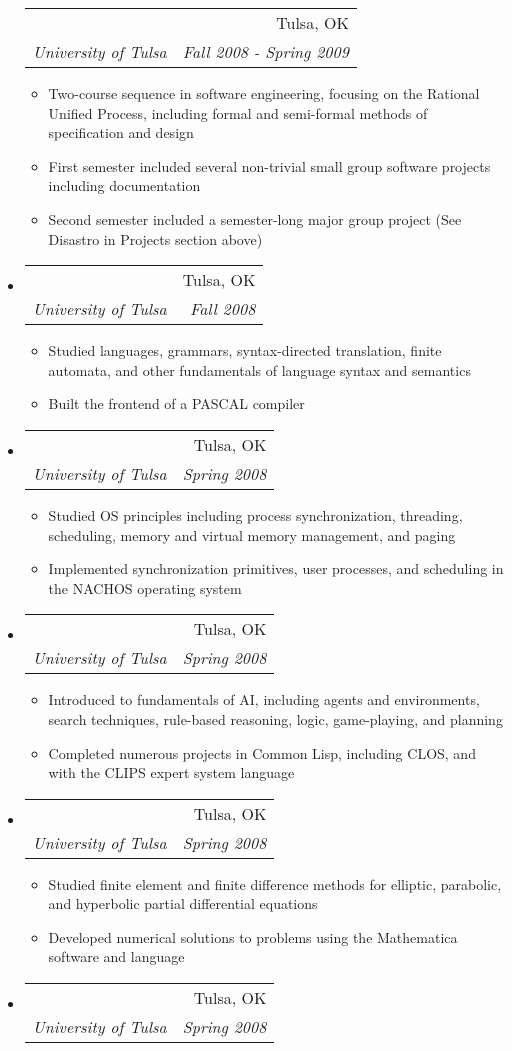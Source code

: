 \documentclass[letterpaper,11pt]{article}
\makeatletter
\newcommand{\resitem}[1]{\item #1 \vspace{-2pt}}
\newcommand{\ressubheading}[4]{
\begin{tabular*}{6.5in}{l@{\extracolsep{\fill}}r}
		\textbf{\parbox{5in}{\raggedright #1 }} & #2 \\
		\textit{#3} & \textit{#4} \\
\end{tabular*}\vspace{-6pt}}
\makeatother
\begin{document}
\begin{itemize}
	\ressubheading{Senior Software Projects}{Tulsa, OK}{University of Tulsa}{Fall 2008 - Spring 2009}
	\begin{itemize}
		\resitem{Two-course sequence in software engineering, focusing on the Rational Unified Process, including formal and semi-formal methods of specification and design}
		\resitem{First semester included several non-trivial small group software projects including documentation}
		\resitem{Second semester included a semester-long major group project (See Disastro in Projects section above)}
	\end{itemize}
\item
	\ressubheading{Compiler Construction}{Tulsa, OK}{University of Tulsa}{Fall 2008}
	\begin{itemize}
		\resitem{Studied languages, grammars, syntax-directed translation, finite automata, and other fundamentals of language syntax and semantics}
		\resitem{Built the frontend of a PASCAL compiler}
	\end{itemize}
\item
	\ressubheading{Operating Systems}{Tulsa, OK}{University of Tulsa}{Spring 2008}
	\begin{itemize}
		\resitem{Studied OS principles including process synchronization, threading, scheduling, memory and virtual memory management, and paging}
		\resitem{Implemented synchronization primitives, user processes, and scheduling in the NACHOS operating system}
	\end{itemize}
\item
	\ressubheading{Artificial Intelligence}{Tulsa, OK}{University of Tulsa}{Spring 2008}
	\begin{itemize}
		\resitem{Introduced to fundamentals of AI, including agents and environments, search techniques, rule-based reasoning, logic, game-playing, and planning}
		\resitem{Completed numerous projects in Common Lisp, including CLOS, and with the CLIPS expert system language}
	\end{itemize}
\item
	\ressubheading{Numerical Methods for IVP/BVPs}{Tulsa, OK}{University of Tulsa}{Spring 2008}
	\begin{itemize}
		\resitem{Studied finite element and finite difference methods for elliptic, parabolic, and hyperbolic partial differential equations}
		\resitem{Developed numerical solutions to problems using the Mathematica software and language}
	\end{itemize}
\item
	\ressubheading{Computer Animation}{Tulsa, OK}{University of Tulsa}{Spring 2008}

\end{itemize}
\end{document}
